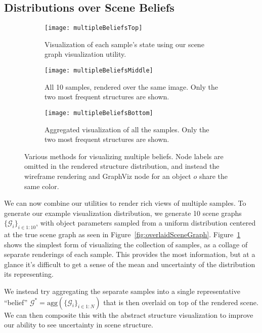 \subsection{Distributions over Scene Beliefs}

\begin{figure}[H]
  \begin{subfigure}[b]{\textwidth}
    \centering
    \texttt{[image: multipleBeliefsTop]}
    \caption{
      Visualization of each sample's state using our scene graph visualization utility.
    }
    \label{fig:multipleBeliefsTop}
  \end{subfigure}
  \begin{subfigure}[b]{\textwidth}
    \centering
    \texttt{[image: multipleBeliefsMiddle]}
    \caption{
      All 10 samples, rendered over the same image. Only the two most frequent structures are shown.
    }
    \label{fig:multipleBeliefsMiddle}
  \end{subfigure}
  \begin{subfigure}[b]{\textwidth}
    \centering
    \texttt{[image: multipleBeliefsBottom]}
    \caption{
      Aggregated visualization of all the samples. Only the two most frequent structures are shown.
    }
    \label{fig:multipleBeliefsBottom}
  \end{subfigure}
  \caption{
    Various methods for visualizing multiple beliefs.
    Node labels are omitted in the rendered structure distribution, and instead the wireframe rendering and GraphViz node for an object $o$ share the same color.
  }
  \label{fig:multipleBeliefs}
\end{figure}

We can now combine our utilities to render rich views of multiple samples.
To generate our example visualization distribution, we generate 10 scene graphs $\{\mathcal{G}_i\}_{i \in 1:10}$, with object parameters sampled from a uniform distribution centered at the true scene graph as seen in Figure~\ref{fig:overlaidSceneGraph}.
Figure~\ref{fig:multipleBeliefsTop} shows the simplest form of visualizing the collection of samples, as a collage of separate renderings of each sample.
This provides the most information, but at a glance it's difficult to get a sense of the mean and uncertainty of the distribution its representing.

We instead try aggregating the separate samples into a single representative ``belief'' $\mathcal{G}^* = \mathrm{agg}(\{\mathcal{G}_i\}_{i \in 1:N})$ that is then overlaid on top of the rendered scene.
We can then composite this with the abstract structure visualization to improve our ability to see uncertainty in scene structure.


